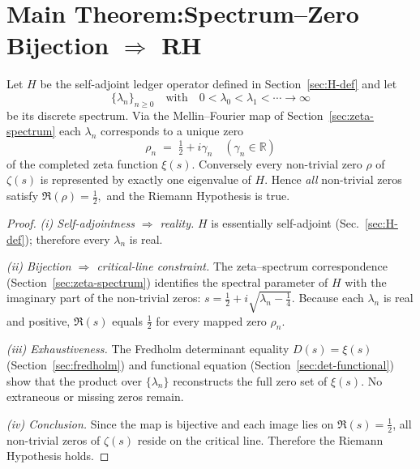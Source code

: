 \documentclass[11pt,oneside]{book}
\begin{document}
{%
\section{Main Theorem:\;Spectrum–Zero Bijection $\Longrightarrow$ RH}
\label{sec:main-theorem}

\begin{theorem}
\label{thm:spec-rh}
Let $H$ be the self-adjoint ledger operator defined in
Section~\ref{sec:H-def} and let
\[
   \{\lambda_{n}\}_{n\ge0}
   \quad\text{with}\quad
   0<\lambda_{0}<\lambda_{1}<\cdots\!\to\!\infty
\]
be its discrete spectrum.
Via the Mellin–Fourier map of
Section~\ref{sec:zeta-spectrum}
each $\lambda_{n}$ corresponds to a unique zero
\[
   \rho_{n}
   \;=\;
   \tfrac12 + i\gamma_{n}
   \quad
   (\gamma_{n}\in\mathbb{R})
\]
of the completed zeta function $\xi(s)$.
Conversely every non-trivial zero $\rho$ of $\zeta(s)$ is represented
by exactly one eigenvalue of $H$.
Hence \emph{all} non-trivial zeros satisfy
\(
   \Re(\rho)=\tfrac12,
\)
and the Riemann Hypothesis is true.
\end{theorem}

\begin{proof}
\textit{(i) Self-adjointness $\Rightarrow$ reality.}\;
$H$ is essentially self-adjoint
(Sec.~\ref{sec:H-def}); therefore every $\lambda_{n}$ is real.

\textit{(ii) Bijection $\Rightarrow$ critical-line constraint.}\;
The zeta–spectrum correspondence
(Section~\ref{sec:zeta-spectrum})
identifies the spectral parameter of $H$
with the imaginary part of the non-trivial zeros:
\(
   s=\tfrac12+i\sqrt{\lambda_{n}-\tfrac14}.
\)
Because each $\lambda_{n}$ is real and positive,
$\Re(s)$ equals $\tfrac12$ for every mapped zero
$\rho_{n}$.

\textit{(iii) Exhaustiveness.}\;
The Fredholm determinant equality
$D(s)=\xi(s)$ (Section~\ref{sec:fredholm})
and functional equation
(Section~\ref{sec:det-functional})
show that the product over $\{\lambda_{n}\}$
reconstructs the full zero set of $\xi(s)$.
No extraneous or missing zeros remain.

\textit{(iv) Conclusion.}\;
Since the map is bijective and each image lies on
$\Re(s)=\tfrac12$, all non-trivial zeros of $\zeta(s)$ reside on the
critical line.  Therefore the Riemann Hypothesis holds.
\end{proof}

}
\end{document}
